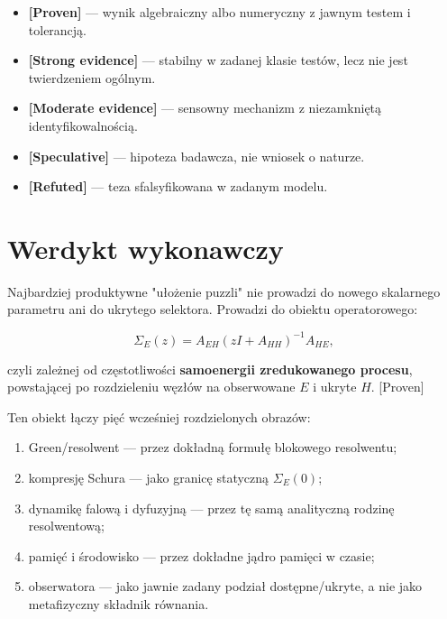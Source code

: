 \documentclass[11pt,a4paper,openany]{report}
\newcommand{\statusProven}{\textcolor{fingreen}{[Proven]}}
\newcommand{\statusStrong}{\textcolor{finblue}{[Strong evidence]}}
\newcommand{\statusModerate}{\textcolor{finviolet}{[Moderate evidence]}}
\newcommand{\statusSpeculative}{\textcolor{finorange}{[Speculative]}}
\newcommand{\statusRefuted}{\textcolor{finred}{[Refuted]}}
\begin{document}
\begin{itemize}
\item 
\textbf{\statusProven{}} --- wynik algebraiczny albo numeryczny z jawnym testem i tolerancją.

\item 
\textbf{\statusStrong{}} --- stabilny w zadanej klasie testów, lecz nie jest twierdzeniem ogólnym.

\item 
\textbf{\statusModerate{}} --- sensowny mechanizm z niezamkniętą identyfikowalnością.

\item 
\textbf{\statusSpeculative{}} --- hipoteza badawcza, nie wniosek o naturze.

\item 
\textbf{\statusRefuted{}} --- teza sfalsyfikowana w zadanym modelu.

\end{itemize}

\chapter{Werdykt wykonawczy}

Najbardziej produktywne "uło\.zenie puzzli" nie prowadzi do nowego skalarnego parametru ani do ukrytego selektora. Prowadzi do obiektu operatorowego:

\[
\Sigma_E(z)=A_{EH}(zI+A_{HH})^{-1}A_{HE},
\]

czyli zale\.znej od częstotliwości \textbf{samoenergii zredukowanego procesu}, powstającej po rozdzieleniu węzłów na obserwowane \(E\) i ukryte \(H\). \statusProven{}

Ten obiekt łączy pięć wcześniej rozdzielonych obrazów:

\begin{enumerate}
\item 
Green/\allowbreak{}resolwent --- przez dokładną formułę blokowego resolwentu;

\item 
kompresję Schura --- jako granicę statyczną \(\Sigma_E(0)\);

\item 
dynamikę falową i dyfuzyjną --- przez tę samą analityczną rodzinę resolwentową;

\item 
pamięć i środowisko --- przez dokładne jądro pamięci w czasie;

\item 
obserwatora --- jako jawnie zadany podział dostępne/\allowbreak{}ukryte, a nie jako metafizyczny składnik równania.

\end{enumerate}
\end{document}
